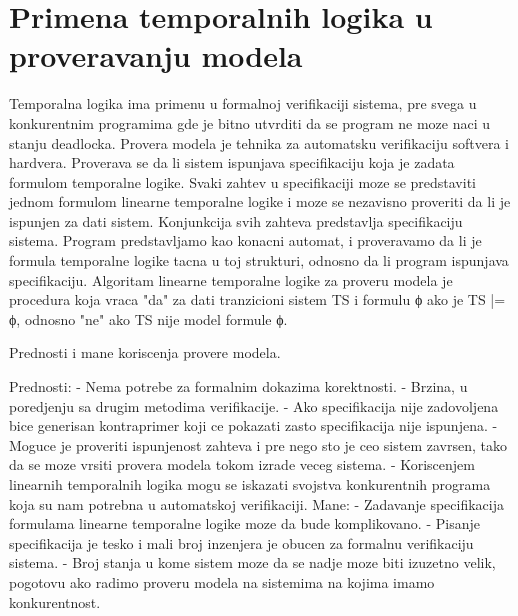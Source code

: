 \documentclass[a4paper]{article}
\begin{document}
	\section{Primena temporalnih logika u proveravanju modela}
	\label{sec:MC}

	Temporalna logika ima primenu u formalnoj verifikaciji sistema, pre svega u konkurentnim programima gde je bitno utvrditi da se program ne moze naci u stanju deadlocka. 
	Provera modela je tehnika za automatsku verifikaciju softvera i hardvera. Proverava se da li sistem ispunjava specifikaciju koja je zadata formulom temporalne logike. 
	Svaki zahtev u specifikaciji moze se predstaviti jednom formulom linearne temporalne logike i moze se nezavisno proveriti da li je ispunjen za dati sistem. Konjunkcija svih zahteva predstavlja specifikaciju sistema.
	Program predstavljamo kao konacni automat, i proveravamo da li je formula temporalne logike tacna u toj strukturi, odnosno da li program ispunjava specifikaciju.
	Algoritam linearne temporalne logike za proveru modela je procedura koja vraca "da" za dati tranzicioni sistem TS i formulu ϕ ako je TS |= ϕ, odnosno "ne" ako TS nije model formule ϕ.

	Prednosti i mane koriscenja provere modela.

	Prednosti: \newline
	- Nema potrebe za formalnim dokazima korektnosti. \newline
	- Brzina, u poredjenju sa drugim metodima verifikacije. \newline
	- Ako specifikacija nije zadovoljena bice generisan kontraprimer koji ce pokazati zasto specifikacija nije ispunjena. \newline
	- Moguce je proveriti ispunjenost zahteva i pre nego sto je ceo sistem zavrsen, tako da se moze vrsiti provera modela tokom izrade veceg sistema. \newline
	- Koriscenjem linearnih temporalnih logika mogu se iskazati svojstva konkurentnih programa koja su nam potrebna u automatskoj verifikaciji. \newline
	Mane: \newline
	- Zadavanje specifikacija formulama linearne temporalne logike moze da bude komplikovano. \newline
	- Pisanje specifikacija je tesko i mali broj inzenjera je obucen za formalnu verifikaciju sistema. \newline
	- Broj stanja u kome sistem moze da se nadje moze biti izuzetno velik, pogotovu ako radimo proveru modela na sistemima na kojima imamo konkurentnost. \newline
\end{document}
